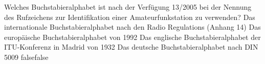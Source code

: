     {Welches Buchstabieralphabet ist nach der Verfügung 13/2005 bei der Nennung des Rufzeichens zur Identifikation einer Amateurfunkstation zu verwenden?}
    {Das internationale Buchstabieralphabet nach den Radio Regulations (Anhang 14)}
    {Das europäische Buchstabieralphabet von 1992}
    {Das englische Buchstabieralphabet der ITU-Konferenz in Madrid von 1932}
    {Das deutsche Buchstabieralphabet nach DIN 5009}
    {false}{false}